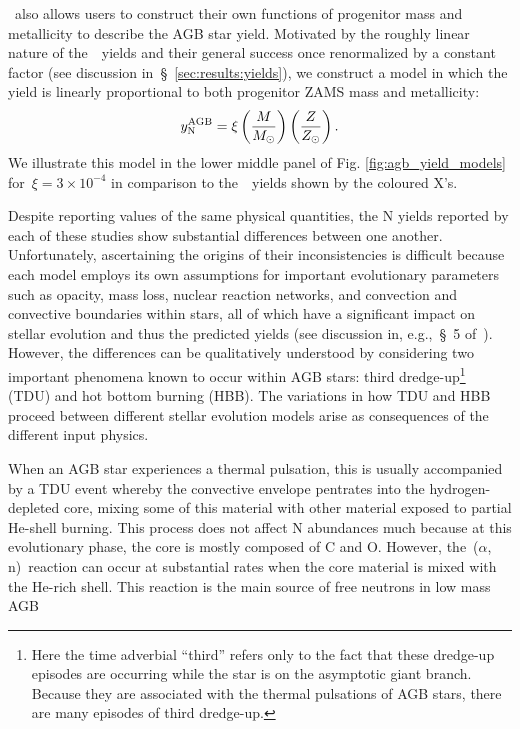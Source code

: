 \documentclass[ms.tex]{subfiles}
\begin{document}
\vice~also allows users to construct their own functions of progenitor mass
and metallicity to describe the AGB star yield.
Motivated by the roughly linear nature of the~\cristallo~yields and their
general success once renormalized by a constant factor (see discussion
in~\S~\ref{sec:results:yields}), we construct a model in which the yield is
linearly proportional to both progenitor ZAMS mass and metallicity:
\begin{equation}
y_\text{N}^\text{AGB} = \xi \left(\frac{M}{M_\odot}\right) \left(\frac{Z}{Z_\odot}\right).
\label{eq:linear_yield}
\end{equation}
We illustrate this model in the lower middle panel of Fig.
\ref{fig:agb_yield_models} for~$\xi = 3\times10^{-4}$ in comparison to
the~\cristallo~yields shown by the coloured X's.
\par
Despite reporting values of the same physical quantities, the N yields
reported by each of these studies show substantial differences between one
another.
Unfortunately, ascertaining the origins of their inconsistencies is difficult
because each model employs its own assumptions for important evolutionary
parameters such as opacity, mass loss, nuclear reaction networks, and
convection and convective boundaries within stars, all of which have a
significant impact on stellar evolution and thus the predicted yields (see
discussion in, e.g.,~\S~5 of~\citealp{Karakas2016}).
However, the differences can be qualitatively understood by considering two
important phenomena known to occur within AGB stars: third dredge-up\footnote{
	Here the time adverbial ``third'' refers only to the fact that these
	dredge-up episodes are occurring while the star is on the asymptotic giant
	branch. Because they are associated with the thermal pulsations of AGB
	stars, there are many episodes of third dredge-up.
} (TDU) and hot bottom burning (HBB).
The variations in how TDU and HBB proceed between different stellar evolution
models arise as consequences of the different input physics.
\par
When an AGB star experiences a thermal pulsation, this is usually accompanied
by a TDU event whereby the convective envelope pentrates into the
hydrogen-depleted core, mixing some of this material with other material
exposed to partial He-shell burning.
This process does not affect N abundances much because at this evolutionary
phase, the core is mostly composed of C and O.
However, the~\Cthirteen($\alpha$, n)\Osixteen~reaction can occur at substantial
rates when the core material is mixed with the He-rich shell.
This reaction is the main source of free neutrons in low mass AGB
\end{document}
